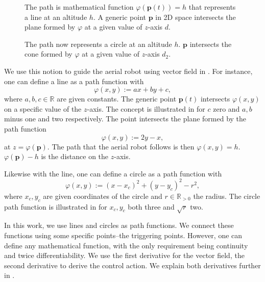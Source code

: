 \begin{figure}[t]
  \centering
  
  \caption[Concept of a line as a path function]{The path is mathematical function $\varphi(\mathbf{p}(t))=h$ that represents a line at an altitude $h$. A generic point $\mathbf{p}$ in 2D space intersects the plane formed by $\varphi$ at a given value of $z$-axis $d$.}
  \label{fig:plot1}
\end{figure}

\begin{figure}[t]
  \centering
  
  
  \caption[Concept of a circle as a path function]{The path now represents a circle at an altitude $h$. $\mathbf{p}$ intersects the cone formed by $\varphi$ at a given value of $z$-axis $d_2$.}
  \label{fig:plot11}
\end{figure}

We use this notion to guide the aerial robot using vector field in . For instance, one can define a line as a path function with
\begin{equation}\label{eq:basic-path}
  \varphi(x,y):=ax+by+c,
\end{equation}
where $a,b,c\in\mathbb{R}$ are given constants. The generic point $\mathbf{p}(t)$ intersects $\varphi(x,y)$ on a specific value of the $z$-axis. The concept is illustrated in  for $c$ zero and $a,b$ minus one and two respectively. The point intersects the plane formed by the path function
\begin{equation}
  \varphi(x,y):=2y-x,
\end{equation}
at $z=\varphi(\mathbf{p})$. The path that the aerial robot follows is then $\varphi(x,y)=h$. $\varphi(\mathbf{p})-h$ is the distance on the $z$-axis.

Likewise with the line, one can define a circle as a path function with
\begin{equation}
  \varphi(x,y):=(x-x_c)^2+(y-y_c)^2-r^2,
\end{equation}
where $x_c,y_c$ are given coordinates of the circle and $r\in\mathbb{R}_{>0}$ the radius. The circle path function is illustrated in  for $x_c,y_c$ both three and $\sqrt{r}$ two. 

In this work, we use lines and circles as path functions. We connect these functions using some specific points--the triggering points. However, one can define any mathematical function, with the only requirement being continuity and twice differentiability. We use the first derivative for the vector field, the second derivative to derive the control action. We explain both derivatives further in .



